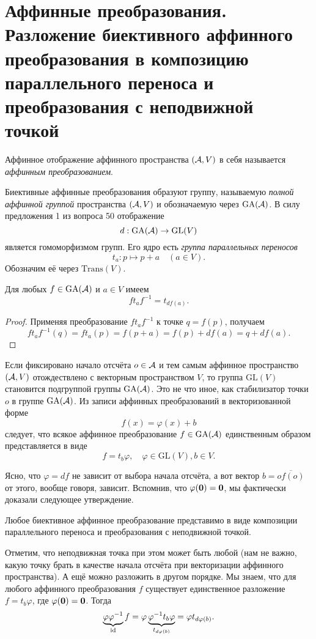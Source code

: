 \section{Аффинные преобразования. Разложение биективного аффинного преобразования в
композицию параллельного переноса и преобразования с неподвижной точкой}

\begin{definition}
    Аффинное отображение аффинного пространства $(\mathcal{A}, V)$ в себя называется \textit{аффинным преобразованием}.
\end{definition}

Биективные аффинные преобразования образуют группу, называемую \textit{полной аффинной группой} пространства $(\mathcal{A}, V)$ и обозначаемую через $\mathrm{GA}(\mathcal{A})$. В силу предложения 1 из вопроса 50 отображение
\[
    d: \mathrm{GA}(\mathcal{A}) \to \mathrm{GL}(V)
\]
является гомоморфизмом групп. Его ядро есть \textit{группа параллельных переносов}
\[
    t_a: p \mapsto p + a\quad(a \in V).
\]
Обозначим её через $\mathrm{Trans}(V)$.

\begin{proposal}
    Для любых $f \in \mathrm{GA}(\mathcal{A})$ и $a \in V$ имеем
    \[
        ft_af^{-1} = t_{df(a)}.
    \]
\end{proposal}

\begin{proof}
    Применяя преобразование $ft_af^{-1}$ к точке $q = f(p)$, получаем
    \[
        ft_af^{-1}(q) = ft_a(p) = f(p + a) = f(p) + df(a) = q + df(a).
    \]
\end{proof}

Если фиксировано начало отсчёта $o \in \mathcal{A}$ и тем самым аффинное пространство $(\mathcal{A}, V)$ отождествлено с векторным пространством $V$, то группа $\mathrm{GL}(V)$ становится подгруппой группы $\mathrm{GA}(\mathcal{A})$. Это не что иное, как стабилизатор точки $o$ в группе $\mathrm{GA}(\mathcal{A})$. Из записи аффинных преобразований в векторизованной форме
\[
    f(x) = \varphi(x) + b
\]
следует, что всякое аффинное преобразование $f \in \mathrm{GA}(\mathcal{A})$ единственным образом представляется в виде
\[
    f = t_b\varphi,\quad \varphi \in \mathrm{GL}(V), b \in V.
\]

Ясно, что $\varphi = df$ не зависит от выбора начала отсчёта, а вот вектор $b = \overline{of(o)}$ от этого, вообще говоря, зависит. Вспомнив, что $\varphi(\boldsymbol{0}) = \boldsymbol{0}$, мы фактически доказали следующее утверждение.

\begin{theorem}
    Любое биективное аффинное преобразование представимо в виде композиции параллельного переноса и преобразования с неподвижной точкой.
\end{theorem}

Отметим, что неподвижная точка при этом может быть любой (нам не важно, какую точку брать в качестве начала отсчёта при векторизации аффинного пространства). А ещё можно разложить в другом порядке. Мы знаем, что для любого аффинного преобразования $f$ существует единственное разложение $f = t_b\varphi$, где $\varphi(\boldsymbol{0}) = \boldsymbol{0}$. Тогда
\[
    \underbrace{\varphi\varphi^{-1}}_{\mathrm{id}}f = \varphi\underbrace{\varphi^{-1}t_b\varphi}_{t_{d\varphi(b)}} = \varphi t_{d\varphi(b)}.
\]

